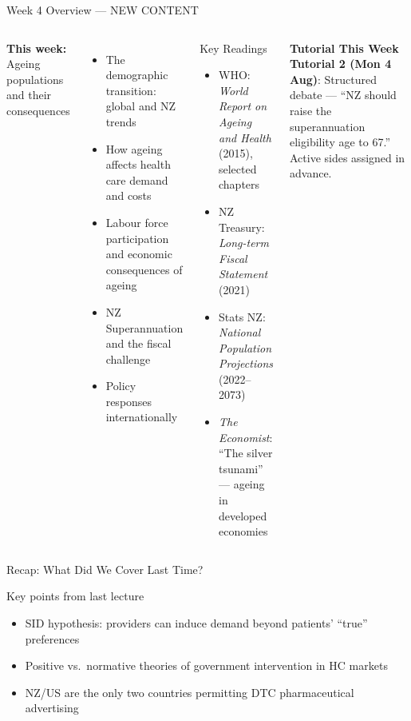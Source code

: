 \documentclass[aspectratio=169, 12pt]{beamer}
\newcommand{\recapslide}[1]{%
  \begin{frame}{Recap: What Did We Cover Last Time?}
    \begin{block}{Key points from last lecture}
      \begin{itemize}#1\end{itemize}
    \end{block}
  \end{frame}}
\newcommand{\tutorialbox}[1]{%
  \begin{block}{\textbf{Tutorial This Week}}
    #1
  \end{block}}
\begin{document}
\begin{frame}{Week 4 Overview — NEW CONTENT}
  \begin{columns}
      \textbf{This week:} Ageing populations and their consequences
      \begin{itemize}
        \item The demographic transition: global and NZ trends
        \item How ageing affects health care demand and costs
        \item Labour force participation and economic consequences of ageing
        \item NZ Superannuation and the fiscal challenge
        \item Policy responses internationally
      \end{itemize}
      \begin{block}{Key Readings}
        {\small
        \begin{itemize}
          \item WHO: \textit{World Report on Ageing and Health} (2015), selected chapters
          \item NZ Treasury: \textit{Long-term Fiscal Statement} (2021)
          \item Stats NZ: \textit{National Population Projections} (2022--2073)
          \item \textit{The Economist}: ``The silver tsunami'' --- ageing in developed economies
        \end{itemize}}
      \end{block}
      \vspace{0.3em}
      \tutorialbox{\textbf{Tutorial 2 (Mon 4 Aug)}: Structured debate --- ``NZ should raise the superannuation eligibility age to 67.'' Active sides assigned in advance.}
  \end{columns}
\end{frame}


\recapslide{
  \item SID hypothesis: providers can induce demand beyond patients' ``true'' preferences
  \item Positive vs.\ normative theories of government intervention in HC markets
  \item NZ/US are the only two countries permitting DTC pharmaceutical advertising
}
\end{document}

